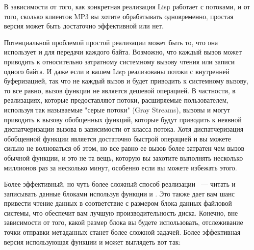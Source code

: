 В зависимости от того, как конкретная реализация Lisp работает с потоками, и от того,
сколько клиентов MP3 вы хотите обрабатывать одновременно, простая версия
 может быть достаточно эффективной или нет.

Потенциальной проблемой простой реализации может быть то, что она использует
 и  для передачи каждого байта. Возможно, что каждый
вызов может приводить к относительно затратному системному вызову чтения или записи одного
байта.  И даже если в вашем Lisp реализованы потоки с внутренней буферизацией, так что не
каждый вызов  и  будет приводить к системному вызову, то
все равно, вызов функции не является дешевой операцией.  В частности, в реализациях,
которые предоставляют потоки, расширяемые пользователем, используя так называемые "серые
потоки" (Gray Streams), вызовы  и  могут приводить к
вызову обобщенных функций, которые будут приводить к неявной диспатчеризации вызова в
зависимости от класса потока.  Хотя диспатчеризация обобщенной функции является достаточно
быстрой операцией и вы можете сильно не волноваться об этом, но все равно ее вызов более
затратен чем вызов обычной функции, и это не та вещь, которую вы захотите выполнять
несколько миллионов раз за несколько минут, особенно если вы можете избежать этого.

Более эффективный, но чуть более сложный способ реализации ~--- читать и
записывать данные блоками используя функции  и .
Это также дает вам шанс привести чтение данных в соответствие с размером блока данных
файловой системы, что обеспечит вам лучшую производительность диска.  Конечно, вне
зависимости от того, какой размер блока вы будете использовать, отслеживание точки
отправки метаданных станет более сложной задачей.  Более эффективная версия
 использующая функции  и 
может выглядеть вот так:

